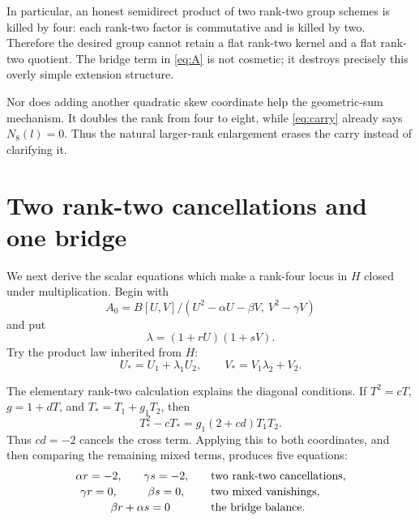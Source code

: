 \documentclass[11pt]{amsart}
\theoremstyle{definition}
\theoremstyle{remark}
\begin{document}
In particular, an honest semidirect product of two rank-two group schemes
is killed by four: each rank-two factor is commutative and is killed by
two.  Therefore the desired group cannot retain a flat rank-two kernel
and a flat rank-two quotient.  The bridge term in \eqref{eq:A} is not
cosmetic; it destroys precisely this overly simple extension structure.

Nor does adding another quadratic skew coordinate help the geometric-sum
mechanism.  It doubles the rank from four to eight, while
\eqref{eq:carry} already says \(N_8(l)=0\).  Thus the natural
larger-rank enlargement erases the carry instead of clarifying it.

\section{Two rank-two cancellations and one bridge}
\label{sec:bridge}

We next derive the scalar equations which make a rank-four locus in \(H\)
closed under multiplication.  Begin with
\begin{equation}\label{eq:general-A}
 A_0=B[U,V]/(U^2-\alpha U-\beta V,\ V^2-\gamma V)
\end{equation}
and put
\[
 \lambda=(1+rU)(1+sV).
\]
Try the product law inherited from \(H\):
\begin{equation}\label{eq:general-product}
 U_*=U_1+\lambda_1U_2,\qquad
 V_*=V_1\lambda_2+V_2.
\end{equation}

The elementary rank-two calculation explains the diagonal conditions.
If \(T^2=cT\), \(g=1+dT\), and
\(T_*=T_1+g_1T_2\), then
\begin{equation}\label{eq:rank-two-cancellation}
 T_*^2-cT_*=g_1(2+cd)T_1T_2.
\end{equation}
Thus \(cd=-2\) cancels the cross term.  Applying this to both coordinates,
and then comparing the remaining mixed terms, produces five equations:
\begin{equation}\label{eq:five}
 \begin{array}{c@{\qquad}c@{\qquad}l}
  \alpha r=-2,&\gamma s=-2,
    &\text{two rank-two cancellations},\\[2pt]
  \gamma r=0,&\beta s=0,
    &\text{two mixed vanishings},\\[2pt]
  \multicolumn{2}{c}{\beta r+\alpha s=0}
    &\text{the bridge balance}.
 \end{array}
\end{equation}
\end{document}
